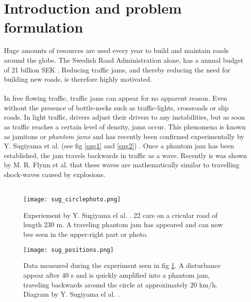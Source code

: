 \section{Introduction and problem formulation}

Huge amounts of resources are used every year to build and maintain roads
around the globe. The Swedish Road Administration alone, has a annual budget
of 21 billion SEK \cite{vagverket}. Reducing traffic jams, and thereby
reducing the need for building new roads, is therefore highly motivated.\\\\

In free flowing traffic, traffic jams can appear for no apparent reason. Even
without the presence of bottle-necks such as traffic-lights, crossroads or
slip roads. In light traffic, drivers adjust their drivers to any
instabilities, but as soon as traffic reaches a certain level of density, jams
occur. This phenomena is known as jamitons or \emph{phantom jams} and has
recently been confirmed experimentally by Y. Sugiyama et al. (see fig
\ref{sug1} and \ref{sug2}) \cite{sugiyama}. Once a phantom jam has been
established, the jam travels backwards in traffic as a wave. Recently is was
shown by M. R. Flynn et al. \cite{mit} that these waves are mathematically
similar to travelling shock-waves caused by explosions.\\\\


\begin{figure}[h]
    \begin{center}
    \texttt{[image: sug\_circlephoto.png]}
    \caption{\label{sug_photo}
Experiement by Y. Sugiyama el al. \cite{sugiyama}. 22 cars on a cricular road
of length 230 m. A traveling phantom jam has appeared and can now bee seen in
the upper-right part or photo.
} \end{center} \end{figure}

\begin{figure}[h]
    \begin{center}
    \texttt{[image: sug\_positions.png]}
    \caption{\label{sug_positions}
Data measured during the experiment seen in fig \ref{sug_photo}. A disturbance
appear after 40 s and is quickly amplified into a phantom jam, traveling
backwards around the circle at approximately 20 km/h.
Diagram by Y. Sugiyama el al. \cite{sugiyama}.}
\end{center} \end{figure}

